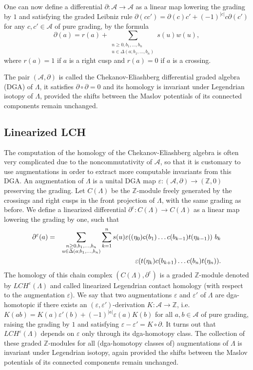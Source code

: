 \documentclass[11pt]{amsart}
\theoremstyle{plain}
\theoremstyle{remark}
\numberwithin{equation}{section}
\newcommand{\Z}{\ensuremath{\mathbb{Z}}}
\begin{document}
One can now define a differential $\partial: \mathcal{A} \to \mathcal{A}$ as a linear map lowering the grading by $1$ and satisfying the graded Leibniz rule
$\partial(cc') = \partial(c) c' + (-1)^{|c|} c \partial(c')$ for any $c, c' \in \mathcal{A}$ of pure grading, by the formula
$$
\partial(a) = r(a) + \sum_{\substack{n \ge 0, b_1, \ldots, b_n \\ u \in \Delta(a;b_1, \ldots, b_n)}} s(u)w(u),  
$$
where $r(a) = 1$ if $a$ is a right cusp and $r(a)=0$ if $a$ is a crossing.

The pair $(\mathcal{A}, \partial)$ is called the Chekanov-Eliashberg differential graded algebra (DGA) of $\Lambda$, it satisfies $\partial \circ \partial = 0$ and its
homology is invariant under Legendrian isotopy of $\Lambda$, provided the shifts between the Maslov potentials of its connected components remain unchanged.

\subsection{Linearized LCH}
\label{sec:lLCH}

The computation of the homology of the Chekanov-Eliashberg algebra is often very complicated due to the noncommutativity of $\mathcal{A}$, so that it is customary to use augmentations in order to
extract more computable invariants from this DGA. An augmentation of $\Lambda$ is a unital DGA map $\varepsilon: (\mathcal{A}, \partial) \to (\Z,0)$ preserving 
the grading. Let $C(\Lambda)$ be the $\Z$-module freely generated by the crossings and right cusps in the front projection of $\Lambda$, with the same grading 
as before. We define a linearized differential $\partial^\varepsilon: C(\Lambda) \to C(\Lambda)$ as a linear map lowering the grading by one, such that
\begin{eqnarray*}
\partial^\varepsilon (a) &=& \sum_{\substack{n \ge 0, b_1, \ldots, b_n \\ u \in \Delta(a;b_1, \ldots, b_n)}} \sum_{k=1}^n s(u)
\varepsilon((\eta_0) c(b_1) \ldots c(b_{k-1}) t(\eta_{k-1})) \ b_k \\ 
&& \hspace{3.5cm} \varepsilon(t(\eta_k) c(b_{k+1}) \ldots c(b_n) t(\eta_n)).
\end{eqnarray*}
The homology of this chain complex $(C(\Lambda), \partial^\varepsilon)$ is a graded $\Z$-module denoted by $LCH^\varepsilon(\Lambda)$ and called linearized
Legendrian contact homology (with respect to the augmentation $\varepsilon$). We say that two augmentations $\varepsilon$ and $\varepsilon'$ of $\Lambda$ 
are dga-homotopic if there exists an $(\varepsilon, \varepsilon')$-derivation $K: \mathcal{A} \to \Z$, i.e. $K(ab) = K(a) \varepsilon'(b) + (-1)^{|a|} \varepsilon(a) K(b)$ for
all $a, b \in \mathcal{A}$ of pure grading, raising the grading by $1$ and satisfying $\varepsilon - \varepsilon' = K \circ \partial$. It turns out that 
$LCH^\varepsilon(\Lambda)$ depends on $\varepsilon$ only through its dga-homotopy class. The collection of these graded $\Z$-modules for all (dga-homotopy 
classes of) augmentations of $\Lambda$ is invariant under Legendrian isotopy, again provided the shifts between the Maslov potentials of its connected 
components remain unchanged.
\end{document}
